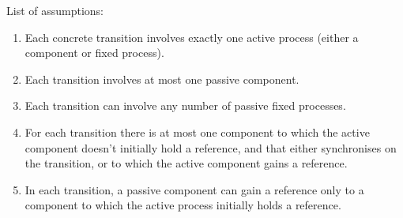List of assumptions:
%
\begin{assumption}\label{assump}
\begin{enumerate}
\item Each concrete transition involves exactly one active process (either a
component or fixed process).

\item Each transition involves at most one passive component.

\item Each transition can involve any number of passive fixed processes.

\item For each transition there is at most one component to which the
active component doesn't initially hold a reference, and that either
synchronises on the transition, or to which the active component gains a
reference.

\item\label{assump:secondary-cpts-new-refs}
In each transition, a passive component can gain a reference only to a
component to which the active process initially holds a reference.
\end{enumerate}
\end{assumption}
